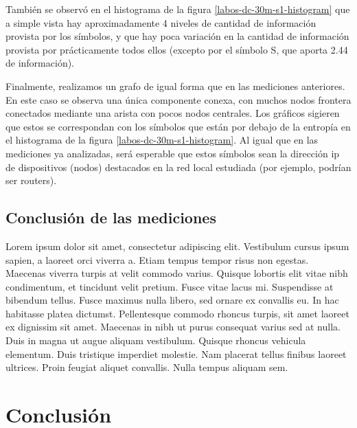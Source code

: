 \documentclass[final,inline,a4paper,narroweqnarray]{ieee}
\begin{document}
  También se observó en el histograma de la figura
  \ref{labos-dc-30m-s1-histogram} que a simple vista hay aproximadamente 4 niveles 
  de cantidad de información provista por los símbolos, y que hay poca
  variación en la cantidad de información provista por prácticamente todos
  ellos (excepto por el símbolo S, que aporta 2.44 de información).
  
  Finalmente, realizamos un grafo de igual forma que en las mediciones
  anteriores. En este caso se observa una única componente conexa, con
  muchos nodos frontera conectados mediante una arista con pocos nodos
  centrales. Los gráficos sigieren que estos se correspondan con los símbolos que
  están por debajo de la entropía en el histograma de la figura
  \ref{labos-dc-30m-s1-histogram}. Al igual que en las mediciones ya
  analizadas, será esperable que estos símbolos sean la dirección ip de
  dispositivos (nodos) destacados en la red local estudiada (por ejemplo,
  podrían ser routers).
  

  \subsection{Conclusión de las mediciones}

Lorem ipsum dolor sit amet, consectetur adipiscing elit. Vestibulum cursus ipsum sapien, a laoreet orci viverra a. Etiam tempus tempor risus non egestas. Maecenas viverra turpis at velit commodo varius. Quisque lobortis elit vitae nibh condimentum, et tincidunt velit pretium. Fusce vitae lacus mi. Suspendisse at bibendum tellus. Fusce maximus nulla libero, sed ornare ex convallis eu. In hac habitasse platea dictumst. Pellentesque commodo rhoncus turpis, sit amet laoreet ex dignissim sit amet. Maecenas in nibh ut purus consequat varius sed at nulla. Duis in magna ut augue aliquam vestibulum. Quisque rhoncus vehicula elementum. Duis tristique imperdiet molestie. Nam placerat tellus finibus laoreet ultrices. Proin feugiat aliquet convallis. Nulla tempus aliquam sem.

\section{Conclusión}
\end{document}

